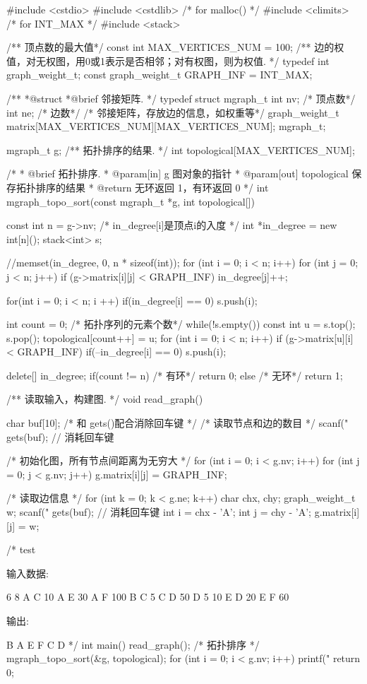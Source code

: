 \begin{Codex}[label=mgraph_topo_sort.c]
#include <cstdio>
#include <cstdlib>  /* for malloc() */
#include <climits>  /* for INT_MAX */
#include <stack>

/** 顶点数的最大值*/
const int MAX_VERTICES_NUM = 100;
/** 边的权值，对无权图，用0或1表示是否相邻；对有权图，则为权值. */
typedef int graph_weight_t;
const graph_weight_t GRAPH_INF = INT_MAX;

/**
 *@struct
 *@brief 邻接矩阵.
 */
typedef struct mgraph_t {
    int nv; /* 顶点数*/
    int ne; /* 边数*/
    /* 邻接矩阵，存放边的信息，如权重等*/
    graph_weight_t matrix[MAX_VERTICES_NUM][MAX_VERTICES_NUM];
} mgraph_t;

mgraph_t g;
/** 拓扑排序的结果. */
int topological[MAX_VERTICES_NUM];

/*
  * @brief 拓扑排序.
  * @param[in] g 图对象的指针
  * @param[out] topological 保存拓扑排序的结果
  * @return 无环返回 1，有环返回 0
  */
int mgraph_topo_sort(const mgraph_t *g, int topological[]) {
    const int n = g->nv;
    /* in_degree[i]是顶点i的入度 */
    int *in_degree = new int[n]();
    stack<int> s;

    //memset(in_degree, 0, n * sizeof(int));
    for (int i = 0; i < n; i++) {
        for (int j = 0; j < n; j++) {
            if (g->matrix[i][j] < GRAPH_INF)
                in_degree[j]++;
        }
    }

    for(int i = 0; i < n; i ++) {
        if(in_degree[i] == 0)
            s.push(i);
    }

    int count = 0; /* 拓扑序列的元素个数*/
    while(!s.empty()) {
        const int u = s.top(); s.pop();
        topological[count++] = u;
        for (int i = 0; i < n; i++) if (g->matrix[u][i] < GRAPH_INF) {
            if(--in_degree[i] == 0) s.push(i);
        }
    }

    delete[] in_degree;
    if(count != n) { /* 有环*/
        return 0;
    } else { /* 无环*/
        return 1;
    }
}

/** 读取输入，构建图. */
void read_graph() {
    char buf[10]; /* 和 gets()配合消除回车键 */
    /* 读取节点和边的数目 */
    scanf("%
    gets(buf); // 消耗回车键

    /* 初始化图，所有节点间距离为无穷大 */
    for (int i = 0; i < g.nv; i++) {
        for (int j = 0; j < g.nv; j++) {
            g.matrix[i][j] = GRAPH_INF;
        }
    }

    /* 读取边信息 */
    for (int k = 0; k < g.ne; k++) {
        char chx, chy;
        graph_weight_t w;
        scanf("%
        gets(buf); // 消耗回车键
        int i = chx - 'A';
        int j = chy - 'A';
        g.matrix[i][j] = w;
    }
}

/* test

输入数据:

6 8
A C 10
A E 30
A F 100
B C 5
C D 50
D 5 10
E D 20
E F 60

输出:

B A E F C D
*/
int main() {
    read_graph();
    /* 拓扑排序 */
    mgraph_topo_sort(&g, topological);
    for (int i = 0; i < g.nv; i++) {
        printf("%
    }
    return 0;
}
\end{Codex}

